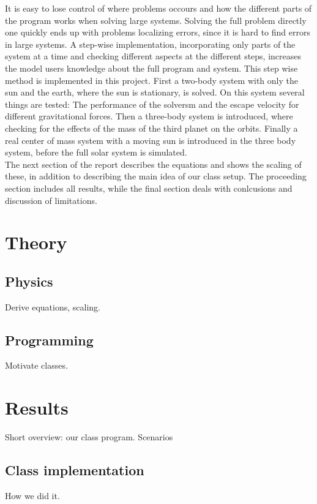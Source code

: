\documentclass{article}
\begin{document}
It is easy to lose control of where problems occours and how the different parts of the program works when solving large systems. Solving the full problem directly one quickly ends up with problems localizing errors, since it is hard to find errors in large systems. A step-wise implementation, incorporating only parts of the system at a time and checking different aspects at the different steps, increases the model users knowledge about the full program and system. This step wise method is implemented in this project. First a two-body system with only the sun and the earth, where the sun is stationary, is solved. On this system several things are tested: The performance of the solversm and the escape velocity for different gravitational forces. Then a three-body system is introduced, where checking for the effects of the mass of the third planet on the orbits. Finally a real center of mass system with a moving sun is introduced in the three body system, before the full solar system is simulated. \\

The next section of the report describes the equations and shows the scaling of these, in addition to describing the main idea of our class setup. The proceeding section includes all results, while the final section deals with conlcusions and discussion of limitations.


\section{Theory}

\subsection{Physics}
Derive equations, scaling.

\subsection{Programming}
Motivate classes. 



\section{Results}
Short overview: our class program. Scenarios

\subsection{Class implementation}
How we did it.
\end{document}
